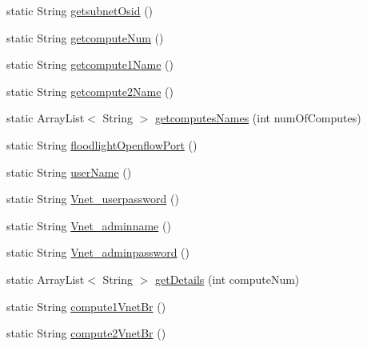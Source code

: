 \begin{DoxyCompactItemize}
\item 
static String \mbox{\hyperlink{classcom_1_1example_1_1demo_1_1util_1_1_app_properties_a96b98f2214ffb3de548c58c85a22ae85}{getsubnet\+Osid}} ()
\item 
static String \mbox{\hyperlink{classcom_1_1example_1_1demo_1_1util_1_1_app_properties_a88f04cc80253c0a5ca11681ac9aabc28}{getcompute\+Num}} ()
\item 
static String \mbox{\hyperlink{classcom_1_1example_1_1demo_1_1util_1_1_app_properties_a601238ec0802fa277e8e96db326df8d9}{getcompute1\+Name}} ()
\item 
static String \mbox{\hyperlink{classcom_1_1example_1_1demo_1_1util_1_1_app_properties_a1898812778637ea02cc3d2b1efed2780}{getcompute2\+Name}} ()
\item 
static Array\+List$<$ String $>$ \mbox{\hyperlink{classcom_1_1example_1_1demo_1_1util_1_1_app_properties_aa2d1c569370978ef7de3450883c20838}{getcomputes\+Names}} (int num\+Of\+Computes)
\item 
static String \mbox{\hyperlink{classcom_1_1example_1_1demo_1_1util_1_1_app_properties_a9222930d5a611d53a08dac58749b46a2}{floodlight\+Openflow\+Port}} ()
\item 
static String \mbox{\hyperlink{classcom_1_1example_1_1demo_1_1util_1_1_app_properties_a9ab853c7914a81c993e54d0c1a9753e7}{user\+Name}} ()
\item 
static String \mbox{\hyperlink{classcom_1_1example_1_1demo_1_1util_1_1_app_properties_af7e86958e5c688e59bdd6557ac24fe89}{Vnet\+\_\+userpassword}} ()
\item 
static String \mbox{\hyperlink{classcom_1_1example_1_1demo_1_1util_1_1_app_properties_aed30afb80183ace8e74847ae80eae16f}{Vnet\+\_\+adminname}} ()
\item 
static String \mbox{\hyperlink{classcom_1_1example_1_1demo_1_1util_1_1_app_properties_a5523c511a2dc15bfe8b5dd21b77eb3cc}{Vnet\+\_\+adminpassword}} ()
\item 
static Array\+List$<$ String $>$ \mbox{\hyperlink{classcom_1_1example_1_1demo_1_1util_1_1_app_properties_a1081f71fed6780de95115392e0bd8b79}{get\+Details}} (int compute\+Num)
\item 
static String \mbox{\hyperlink{classcom_1_1example_1_1demo_1_1util_1_1_app_properties_a676cdb26c2880dc78a88433d47f46d67}{compute1\+Vnet\+Br}} ()
\item 
static String \mbox{\hyperlink{classcom_1_1example_1_1demo_1_1util_1_1_app_properties_ad2b7be2759536bca62775d022bff4b1f}{compute2\+Vnet\+Br}} ()
\end{DoxyCompactItemize}

